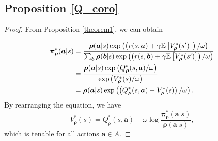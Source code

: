 \documentclass{article}
\begin{document}
	\subsection{Proposition \ref{Q_coro}} \label{app:Q_coro}
	\begin{proof}
	    From Proposition \ref{theorem1}, we can obtain
        \iffalse
        \begin{align}
        	{\bm{\pi}}^*_{\bm{\rho}}(\bm{a}|s) & = \frac{{\bm{\rho}}(\bm{a}|s) \exp\left( \left(r(s,\bm{a}) + \gamma \mathbb{E}_{s^\prime \sim P(\cdot|s,\bm{a})}\left[ V^*_{\bm{\rho}}(s^{\prime})\right]\right) / \omega   \right)}
        	{\sum_{\bm{b}} {\bm{\rho}}(\bm{b}|s) \exp\left( \left(r(s,\bm{b}) + \gamma \mathbb{E}_{s^\prime \sim P(\cdot|s,\bm{b})}\left[ V^*_{\bm{\rho}}(s^{\prime})\right]\right) / \omega \right)}  
        	= \frac{{\bm{\rho}}(\bm{a}|s) \exp\left(  Q^*_{\bm{\rho}}(s,\bm{a}) / \omega   \right)}
        	{\exp\left(  V^*_{\bm{\rho}}(s) / \omega   \right)} \notag \\
        	& = {\bm{\rho}}(\bm{a}|s) \exp \left( \left( Q^*_{\bm{\rho}}(s,\bm{a}) - V^*_{\bm{\rho}}(s) \right) / \omega  \right). 
        \end{align}
        \fi
        \begin{align}
        	{\bm{\pi}}^*_{\bm{\rho}}(\bm{a}|s) & = \frac{{\bm{\rho}}(\bm{a}|s) \exp\left( \left(r(s,\bm{a}) + \gamma \mathbb{E}\left[ V^*_{\bm{\rho}}(s^{\prime})\right]\right) / \omega   \right)}
        	{\sum_{\bm{b}} {\bm{\rho}}(\bm{b}|s) \exp\left( \left(r(s,\bm{b}) + \gamma \mathbb{E}\left[ V^*_{\bm{\rho}}(s^{\prime})\right]\right) / \omega \right)} \notag \\
        	& = \frac{{\bm{\rho}}(\bm{a}|s) \exp\left(  Q^*_{\bm{\rho}}(s,\bm{a}) / \omega   \right)}
        	{\exp\left(  V^*_{\bm{\rho}}(s) / \omega   \right)}  \notag \\
        	& = {\bm{\rho}}(\bm{a}|s) \exp \left( \left( Q^*_{\bm{\rho}}(s,\bm{a}) - V^*_{\bm{\rho}}(s) \right) / \omega  \right). 
        \end{align}
        By rearranging the equation, we have
        \vspace{-0.2cm}
        \begin{equation}
        	V^*_{\bm{\rho}}(s) = Q^*_{\bm{\rho}}(s,\bm{a}) - \omega \log \frac{{\bm{\pi}^*_{\bm{\rho}}}(\bm{a}|s)}{{\bm{\rho}}(\bm{a}|s)},
        \end{equation}
        which is tenable for all actions $\bm{a} \in A$. 
	\end{proof}
	
\end{document}
